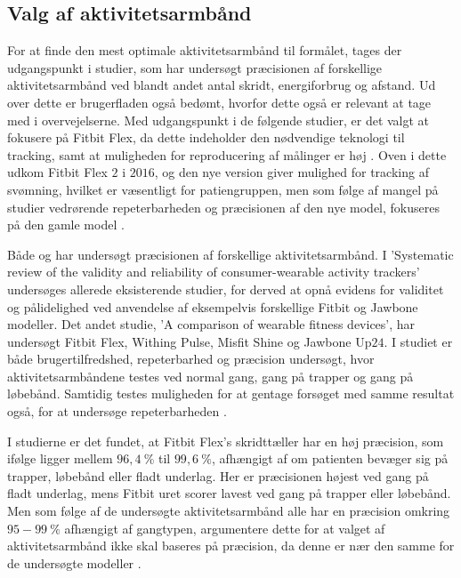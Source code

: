 \subsection{Valg af aktivitetsarmbånd}

For at finde den mest optimale aktivitetsarmbånd til formålet, tages der udgangspunkt i studier, som har undersøgt præcisionen af forskellige aktivitetsarmbånd ved blandt andet antal skridt, energiforbrug og afstand. Ud over dette er brugerfladen også bedømt, hvorfor dette også er relevant at tage med i overvejelserne. Med udgangspunkt i de følgende studier, er det valgt at fokusere på Fitbit Flex, da dette indeholder den nødvendige teknologi til tracking, samt at muligheden for reproducering af målinger er høj \citep{kaewkannate2016}. Oven i dette udkom Fitbit Flex $2$ i $2016$, og den nye version giver mulighed for tracking af svømning, hvilket er væsentligt for patiengruppen, men som følge af mangel på studier vedrørende repeterbarheden og præcisionen af den nye model, fokuseres på den gamle model \citep{fitbitflex}.

Både \citeauthor{evenson2015} og \citeauthor{kaewkannate2016} har undersøgt præcisionen af forskellige aktivitetsarmbånd. I 'Systematic review of the validity and reliability of consumer-wearable activity trackers' undersøges allerede eksisterende studier, for derved at opnå evidens for validitet og pålidelighed ved anvendelse af eksempelvis forskellige Fitbit og Jawbone modeller. Det andet studie, 'A comparison of wearable fitness devices', har undersøgt Fitbit Flex, Withing Pulse, Misfit Shine og Jawbone Up$24$. I studiet er både brugertilfredshed, repeterbarhed og præcision undersøgt, hvor aktivitetsarmbåndene testes ved normal gang, gang på trapper og gang på løbebånd. Samtidig testes muligheden for at gentage forsøget med samme resultat også, for at undersøge repeterbarheden \citep{evenson2015, kaewkannate2016}.

I studierne er det fundet, at Fitbit Flex's skridttæller har en høj præcision, som ifølge \citeauthor{kaewkannate2016} ligger mellem $96,4~\%$ til $99,6~\%$, afhængigt af om patienten bevæger sig på trapper, løbebånd eller fladt underlag. Her er præcisionen højest ved gang på fladt underlag, mens Fitbit uret scorer lavest ved gang på trapper eller løbebånd. Men som følge af de undersøgte aktivitetsarmbånd alle har en præcision omkring $95-99~\%$ afhængigt af gangtypen, argumentere dette for at valget af aktivitetsarmbånd ikke skal baseres på præcision, da denne er nær den samme for de undersøgte modeller \citep{kaewkannate2016}.

